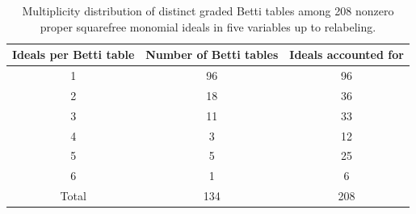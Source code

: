 \begin{table}[h]
\centering
\begin{tabular}{ccc}
\hline
Ideals per Betti table & Number of Betti tables & Ideals accounted for \\
\hline
1 & 96 & 96 \\
2 & 18 & 36 \\
3 & 11 & 33 \\
4 & 3 & 12 \\
5 & 5 & 25 \\
6 & 1 & 6 \\
\hline
Total & 134 & 208 \\
\hline
\end{tabular}
\caption{Multiplicity distribution of distinct graded Betti tables among 208 nonzero proper squarefree monomial ideals in five variables up to relabeling.}
\end{table}
